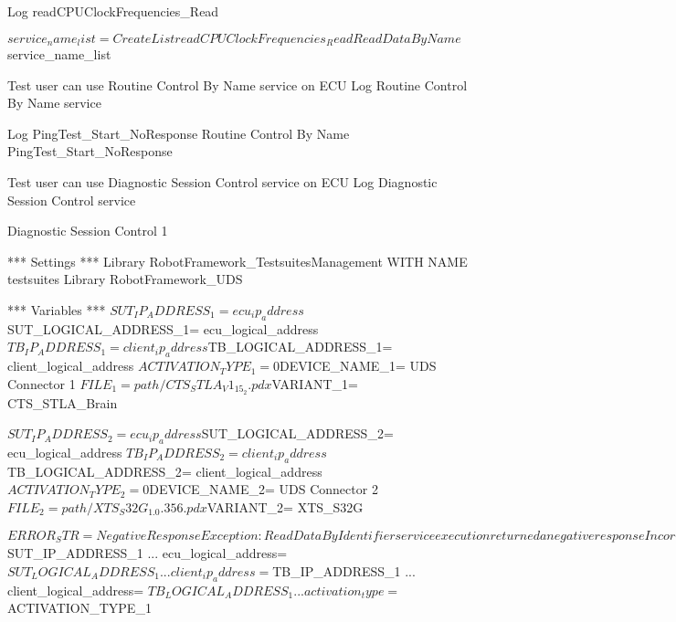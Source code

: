 \begin{robotcode}
    Log    readCPUClockFrequencies_Read

    ${service_name_list}=    Create List    readCPUClockFrequencies_Read
    Read Data By Name    ${service_name_list}

Test user can use Routine Control By Name service on ECU
    Log    Routine Control By Name service

    Log    PingTest_Start_NoResponse
    Routine Control By Name    PingTest_Start_NoResponse

Test user can use Diagnostic Session Control service on ECU
    Log    Diagnostic Session Control service

    Diagnostic Session Control    1
\end{robotcode}



\begin{robotcode}
*** Settings ***
Library    RobotFramework_TestsuitesManagement    WITH NAME    testsuites
Library    RobotFramework_UDS

*** Variables ***
${SUT_IP_ADDRESS_1}=         ecu_ip_address
${SUT_LOGICAL_ADDRESS_1}=    ecu_logical_address
${TB_IP_ADDRESS_1}=          client_ip_address
${TB_LOGICAL_ADDRESS_1}=     client_logical_address
${ACTIVATION_TYPE_1}=        0
${DEVICE_NAME_1}=            UDS Connector 1
${FILE_1}=                   path/CTS_STLA_V1_15_2.pdx
${VARIANT_1}=                CTS_STLA_Brain

${SUT_IP_ADDRESS_2}=         ecu_ip_address
${SUT_LOGICAL_ADDRESS_2}=    ecu_logical_address
${TB_IP_ADDRESS_2}=          client_ip_address
${TB_LOGICAL_ADDRESS_2}=     client_logical_address
${ACTIVATION_TYPE_2}=        0
${DEVICE_NAME_2}=            UDS Connector 2
${FILE_2}=                   path/XTS_S32G_1.0.356.pdx
${VARIANT_2}=                XTS_S32G

${ERROR_STR}=    NegativeResponseException: ReadDataByIdentifier service execution returned a negative response IncorrectMessageLengthOrInvalidFormat (0x13)
*** Test Cases ***
Test user can connect single UDS connection
    Log    Test user can connect single UDS connection
    Log    If no device_name is provided, it will default to 'default'

    Create UDS Connector    ecu_ip_address= ${SUT_IP_ADDRESS_1}
    ...                     ecu_logical_address= ${SUT_LOGICAL_ADDRESS_1}
    ...                     client_ip_address= ${TB_IP_ADDRESS_1}
    ...                     client_logical_address= ${TB_LOGICAL_ADDRESS_1}
    ...                     activation_type= ${ACTIVATION_TYPE_1}


\end{robotcode}
